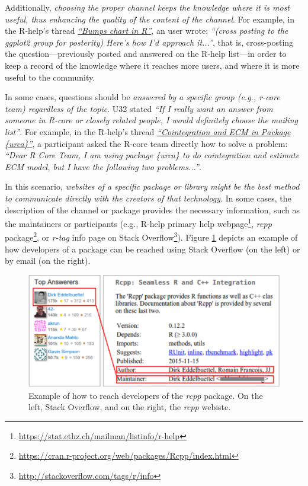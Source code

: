         Additionally, \emph{choosing the proper channel keeps the knowledge where it is most useful, thus enhancing the quality of the content of the channel}.
        For example, in the R-help's thread \textit{\href{http://goo.gl/EJHWrs}{``Bumps chart in R''}}, an user wrote: \textit{``(cross posting to the ggplot2 group for posterity) Here's how I'd approach it...''}, that is, cross-posting the question---previously posted and answered on the R-help list---in order to keep a record of the knowledge where it reaches more users, and where it is more useful to the community.

        In some cases, questions should be \emph{answered by a \textit{specific group} (e.g., r-core team) regardless of the topic}.
        U32 stated \textit{``If I really want an answer from someone in R-core or closely related people, I would definitely choose the mailing list''}.
        For example, in the R-help's thread \textit{\href{http://goo.gl/7olLv7}{``Cointegration and ECM in Package \{urca\}''}}, a participant asked the R-core team directly how to solve a problem: \textit{``Dear R Core Team, I am using package \{urca\} to do cointegration and estimate ECM model, but I have the following two problems...''}.

        In this scenario, \emph{websites of a specific package or library might be the best method to communicate directly with the creators of that technology}.
        In some cases, the description of the channel or package provides the necessary information, such as the maintainers or participants (e.g., R-help primary help webpage\footnote{\url{https://stat.ethz.ch/mailman/listinfo/r-help}}, \emph{rcpp} package\footnote{\url{https://cran.r-project.org/web/packages/Rcpp/index.html}}, or \textit{r-tag} info page on Stack Overflow\footnote{\url{http://stackoverflow.com/tags/r/info}}).
        Figure \ref{fig:CCchannel} depicts an example of how developers of a package can be reached using Stack Overflow (on the left) or by email (on the right). 

        \begin{figure} [!htb]
            \centering
            \includegraphics[width=.9\columnwidth]{Figures/CCchannel}
            \caption{Example of how to reach developers of the \emph{rcpp} package. On the left, Stack Overflow, and on the right, the \emph{rcpp} webiste.}
            \label{fig:CCchannel}
        \end{figure}

